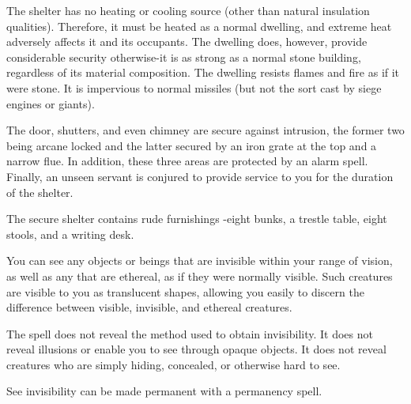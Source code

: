 \begin{multicols}{2}
\begin{small}
\smallskip\noindent The shelter has no heating or cooling source (other than natural insulation qualities). Therefore, it must be heated as a normal dwelling, and extreme heat adversely affects it and its occupants. The dwelling does, however, provide considerable security otherwise-it is as strong as a normal stone building, regardless of its material composition. The dwelling resists flames and fire as if it were stone. It is impervious to normal missiles (but not the sort cast by siege engines or giants).

\smallskip\noindent The door, shutters, and even chimney are secure against intrusion, the former two being arcane locked and the latter secured by an iron grate at the top and a narrow flue. In addition, these three areas are protected by an alarm spell. Finally, an unseen servant is conjured to provide service to you for the duration of the shelter.

\smallskip\noindent The secure shelter contains rude furnishings -eight bunks, a trestle table, eight stools, and a writing desk.


\noindent You can see any objects or beings that are invisible within your range of vision, as well as any that are ethereal, as if they were normally visible. Such creatures are visible to you as translucent shapes, allowing you easily to discern the difference between visible, invisible, and ethereal creatures.

\smallskip\noindent The spell does not reveal the method used to obtain invisibility. It does not reveal illusions or enable you to see through opaque objects. It does not reveal creatures who are simply hiding, concealed, or otherwise hard to see.

\smallskip\noindent See invisibility can be made permanent with a permanency spell.


\end{small}
\end{multicols}
